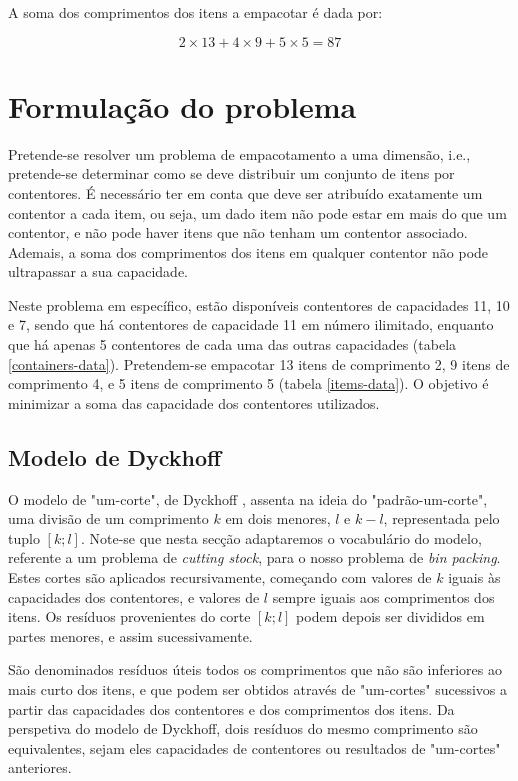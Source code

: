 \documentclass[12pt, a4paper, titlepage]{article}
\begin{document}
A soma dos comprimentos dos itens a empacotar é dada por:

\begin{equation}
    2 \times 13 + 4 \times 9 + 5 \times 5 = 87
    \label{eq:items-sum}
\end{equation}

\section{Formulação do problema}

Pretende-se resolver um problema de empacotamento a uma dimensão, i.e., pretende-se determinar como
se deve distribuir um conjunto de itens por contentores. É necessário ter em conta que deve ser
atribuído exatamente um contentor a cada item, ou seja, um dado item não pode estar em mais do que
um contentor, e não pode haver itens que não tenham um contentor associado. Ademais, a soma dos
comprimentos dos itens em qualquer contentor não pode ultrapassar a sua capacidade.

Neste problema em específico, estão disponíveis contentores de capacidades 11, 10 e 7, sendo que há
contentores de capacidade 11 em número ilimitado, enquanto que há apenas 5 contentores de cada uma
das outras capacidades (tabela \ref{containers-data}). Pretendem-se empacotar 13 itens de
comprimento 2, 9 itens de comprimento 4, e 5 itens de comprimento 5 (tabela \ref{items-data}). O
objetivo é minimizar a soma das capacidade dos contentores utilizados.

\subsection{Modelo de Dyckhoff}

O modelo de "um-corte"{}, de Dyckhoff \cite{dyckhoff}, assenta na ideia do "padrão-um-corte", uma
divisão de um comprimento $k$ em dois menores, $l$ e $k - l$, representada pelo tuplo $[k; l]$.
Note-se que nesta secção adaptaremos o vocabulário do modelo, referente a um problema de
\emph{cutting stock}, para o nosso problema de \emph{bin packing}. Estes cortes são aplicados
recursivamente, começando com valores de $k$ iguais às capacidades dos contentores, e valores de $l$
sempre iguais aos comprimentos dos itens. Os resíduos provenientes do corte $[k; l]$ podem depois
ser divididos em partes menores, e assim sucessivamente.

São denominados resíduos úteis todos os comprimentos que não são inferiores ao mais curto dos itens,
e que podem ser obtidos através de "um-cortes"{} sucessivos a partir das capacidades dos contentores
e dos comprimentos dos itens. Da perspetiva do modelo de Dyckhoff, dois resíduos do mesmo
comprimento são equivalentes, sejam eles capacidades de contentores ou resultados de "um-cortes"{}
anteriores.
\end{document}
